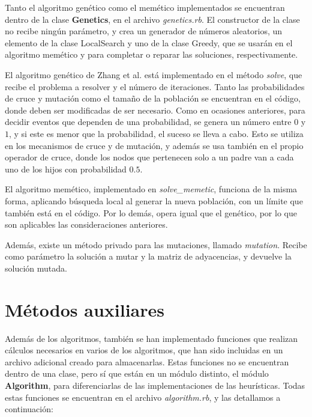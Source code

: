 Tanto el algoritmo genético como el memético implementados se encuentran dentro de
la clase \textbf{Genetics}, en el archivo \textit{genetics.rb}. El constructor
de la clase no recibe ningún parámetro, y crea un generador de números aleatorios,
un elemento de la clase LocalSearch y uno de la clase Greedy, que se usarán en el
algoritmo memético y para completar o reparar las soluciones, respectivamente.

El algoritmo genético de Zhang et al. está implementado en el método \textit{solve},
que recibe el problema a resolver y el número de iteraciones. Tanto las probabilidades
de cruce y mutación como el tamaño de la población se encuentran en el código, donde
deben ser modificadas de ser necesario. Como en ocasiones anteriores, para decidir
eventos que dependen de una probabilidad, se genera un número entre $0$ y $1$, y si
este es menor que la probabilidad, el suceso se lleva a cabo. Esto se utiliza en
los mecanismos de cruce y de mutación, y además se usa también en el propio operador
de cruce, donde los nodos que pertenecen solo a un padre van a cada uno de los
hijos con probabilidad $0.5$.

El algoritmo memético, implementado en \textit{solve\_memetic}, funciona de la misma
forma, aplicando búsqueda local al generar la nueva población, con un límite que
también está en el código. Por lo demás, opera  igual que el genético, por lo que
son aplicables las consideraciones anteriores.

Además, existe un método privado para las mutaciones, llamado \textit{mutation}.
Recibe como parámetro la solución a mutar y la matriz de adyacencias, y devuelve
la solución mutada.


\section{Métodos auxiliares}

Además de los algoritmos, también se han implementado funciones que realizan
cálculos necesarios en varios de los algoritmos, que han sido incluidas en un
archivo adicional creado para almacenarlas. Estas funciones no se encuentran
dentro de una clase, pero sí que están en un módulo distinto, el módulo \textbf{Algorithm},
para diferenciarlas de las implementaciones de las heurísticas. Todas estas funciones
se encuentran en el archivo \textit{algorithm.rb}, y las detallamos a continuación:


